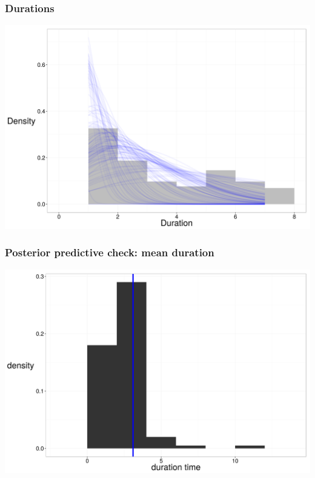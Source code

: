 \documentclass{beamer}
\begin{document}
\begin{frame}
  \frametitle{Durations}
  \begin{center}
    \includegraphics[height = 0.8\textheight, width = \textwidth, keepaspectratio = true]{figure/wei_dur_post}
  \end{center}
\end{frame}

\begin{frame}
  \frametitle{Posterior predictive check: mean duration}
  \begin{center}
    \includegraphics[height = 0.8\textheight, width = \textwidth, keepaspectratio = true]{figure/wei_mean_ppc}
  \end{center}
\end{frame}

\end{document}

